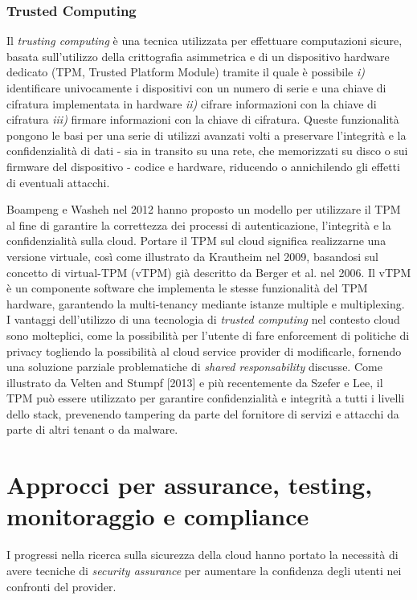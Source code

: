 \documentclass[../main.tex]{subfiles}
\begin{document}
\subsubsection{Trusted Computing}
Il \textit{trusting computing} è una tecnica utilizzata per effettuare computazioni sicure, basata sull'utilizzo della crittografia asimmetrica e di un dispositivo hardware dedicato (TPM, Trusted Platform Module) tramite il quale è possibile \textit{i)} identificare univocamente i dispositivi con un numero di serie e una chiave di cifratura implementata in hardware \textit{ii)} cifrare informazioni con la chiave di cifratura \textit{iii)} firmare informazioni con la chiave di cifratura.
Queste funzionalità pongono le basi per una serie di utilizzi avanzati volti a preservare l'integrità e la confidenzialità di dati - sia in transito su una rete, che memorizzati su disco o sui firmware del dispositivo - codice e hardware, riducendo o annichilendo gli effetti di eventuali attacchi.

Boampeng e Washeh nel 2012 hanno proposto un modello per utilizzare il TPM al fine di garantire la correttezza dei processi di autenticazione, l'integrità e la confidenzialità sulla cloud.
Portare il TPM sul cloud significa realizzarne una versione virtuale, così come illustrato da Krautheim nel 2009, basandosi sul concetto di virtual-TPM (vTPM) già descritto da Berger et al. nel 2006.
Il vTPM è un componente software che implementa le stesse funzionalità del TPM hardware, garantendo la multi-tenancy mediante istanze multiple e multiplexing.
I vantaggi dell'utilizzo di una tecnologia di \textit{trusted computing} nel contesto cloud sono molteplici, come la possibilità per l'utente di fare enforcement di politiche di privacy togliendo la possibilità al cloud service provider di modificarle, fornendo una soluzione parziale problematiche di \textit{shared responsability} discusse. 
Come illustrato da Velten and Stumpf [2013] e più recentemente da Szefer e Lee, il TPM può essere utilizzato per garantire confidenzialità e integrità a tutti i livelli dello stack, prevenendo tampering da parte del fornitore di servizi e attacchi da parte di altri tenant o da malware.

\begin{comment}
\end{comment}

\section{Approcci per assurance, testing, monitoraggio e compliance}
I progressi nella ricerca sulla sicurezza della cloud hanno portato la necessità di avere tecniche di \textit{security assurance} per aumentare la confidenza degli utenti nei confronti del provider\cite{6814039}.
\end{document}
